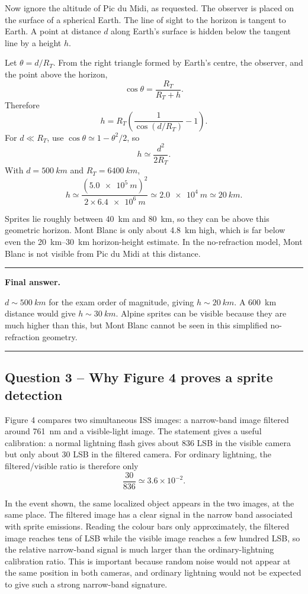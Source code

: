\documentclass[11pt,a4paper]{article}
\newenvironment{finalanswer}{%
  \begin{center}\begin{minipage}{0.94\linewidth}\hrule\vspace{0.45em}\textbf{Final answer. }%
}{%
  \vspace{0.45em}\hrule\end{minipage}\end{center}%
}
\newcommand{\RT}{R_T}
\begin{document}
Now ignore the altitude of Pic du Midi, as requested. The observer is placed on the surface of a spherical Earth. The line of sight to the horizon is tangent to Earth. A point at distance $d$ along Earth's surface is hidden below the tangent line by a height $h$.

Let $\theta=d/\RT$. From the right triangle formed by Earth's centre, the observer, and the point above the horizon,
\[
 \cos\theta=\frac{\RT}{\RT+h}.
\]
Therefore
\[
 h=\RT\left(\frac{1}{\cos(d/\RT)}-1\right).
\]
For $d\ll \RT$, use $\cos\theta\simeq1-\theta^2/2$, so
\[
 h\simeq \frac{d^2}{2\RT}.
\]
With $d=\SI{500}{km}$ and $\RT=\SI{6400}{km}$,
\[
 h\simeq \frac{(\SI{5.0e5}{m})^2}{2\times \SI{6.4e6}{m}}
      \simeq \SI{2.0e4}{m}
      \simeq \SI{20}{km}.
\]

Sprites lie roughly between \SI{40}{km} and \SI{80}{km}, so they can be above this geometric horizon. Mont Blanc is only about \SI{4.8}{km} high, which is far below even the \SIrange{20}{30}{km} horizon-height estimate. In the no-refraction model, Mont Blanc is not visible from Pic du Midi at this distance.

\begin{finalanswer}
$d\sim\SI{500}{km}$ for the exam order of magnitude, giving $h\sim\SI{20}{km}$. A \SI{600}{km} distance would give $h\sim\SI{30}{km}$. Alpine sprites can be visible because they are much higher than this, but Mont Blanc cannot be seen in this simplified no-refraction geometry.
\end{finalanswer}

\subsection*{Question 3 -- Why Figure 4 proves a sprite detection}

Figure 4 compares two simultaneous ISS images: a narrow-band image filtered around \SI{761}{nm} and a visible-light image. The statement gives a useful calibration: a normal lightning flash gives about 836 LSB in the visible camera but only about 30 LSB in the filtered camera. For ordinary lightning, the filtered/visible ratio is therefore only
\[
 \frac{30}{836}\simeq3.6\times10^{-2}.
\]

In the event shown, the same localized object appears in the two images, at the same place. The filtered image has a clear signal in the narrow band associated with sprite emissions. Reading the colour bars only approximately, the filtered image reaches tens of LSB while the visible image reaches a few hundred LSB, so the relative narrow-band signal is much larger than the ordinary-lightning calibration ratio. This is important because random noise would not appear at the same position in both cameras, and ordinary lightning would not be expected to give such a strong narrow-band signature.
\end{document}
